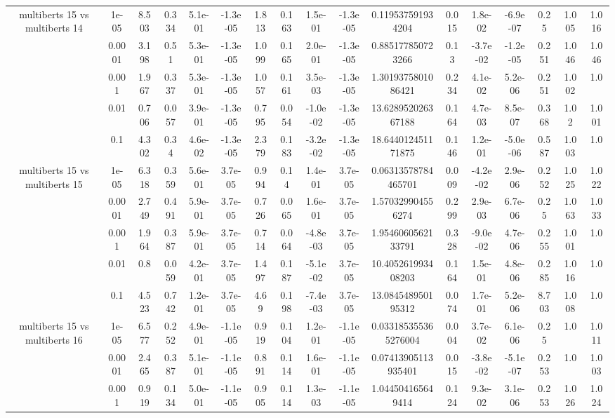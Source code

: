 \begin{tabular}{|c|c|c|c|c|c|c|c|c|c|c|c|c|c|c|c|c|}
\hline
\multirow{5}{*}{multiberts 15 vs multiberts 14} & 1e-05 & 8.503 & 0.334 & 5.1e-01 & -1.3e-05 & 1.813 & 0.163 & 1.5e-01 & -1.3e-05 & 0.119537591934204 & 0.015 & 1.8e-02 & -6.9e-07 & 0.25 & 1.005 & 1.016 \\
 & 0.0001 & 3.198 & 0.51 & 5.3e-01 & -1.3e-05 & 1.099 & 0.165 & 2.0e-01 & -1.3e-05 & 0.885177850723266 & 0.13 & -3.7e-02 & -1.2e-05 & 0.251 & 1.046 & 1.046 \\
 & 0.001 & 1.967 & 0.337 & 5.3e-01 & -1.3e-05 & 1.057 & 0.161 & 3.5e-03 & -1.3e-05 & 1.3019375801086421 & 0.234 & 4.1e-02 & 5.2e-06 & 0.251 & 1.002 & 1.0 \\
 & 0.01 & 0.706 & 0.057 & 3.9e-01 & -1.3e-05 & 0.795 & 0.054 & -1.0e-02 & -1.3e-05 & 13.628952026367188 & 0.164 & 4.7e-03 & 8.5e-07 & 0.368 & 1.02 & 1.001 \\
 & 0.1 & 4.302 & 0.34 & 4.6e-02 & -1.3e-05 & 2.379 & 0.183 & -3.2e-02 & -1.3e-05 & 18.644012451171875 & 0.146 & 1.2e-01 & -5.0e-06 & 0.587 & 1.003 & 1.0 \\
\hline
\multirow{5}{*}{multiberts 15 vs multiberts 15} & 1e-05 & 6.318 & 0.359 & 5.6e-01 & 3.7e-05 & 0.994 & 0.14 & 1.4e-01 & 3.7e-05 & 0.06313578784465701 & 0.009 & -4.2e-02 & 2.9e-06 & 0.252 & 1.025 & 1.022 \\
 & 0.0001 & 2.749 & 0.491 & 5.9e-01 & 3.7e-05 & 0.726 & 0.065 & 1.6e-01 & 3.7e-05 & 1.570329904556274 & 0.299 & 2.9e-03 & 6.7e-06 & 0.25 & 1.063 & 1.033 \\
 & 0.001 & 1.964 & 0.387 & 5.9e-01 & 3.7e-05 & 0.714 & 0.064 & -4.8e-03 & 3.7e-05 & 1.9546060562133791 & 0.328 & -9.0e-02 & 4.7e-06 & 0.255 & 1.001 & 1.0 \\
 & 0.01 & 0.8 & 0.059 & 4.2e-01 & 3.7e-05 & 1.497 & 0.187 & -5.1e-02 & 3.7e-05 & 10.405261993408203 & 0.164 & 1.5e-01 & 4.8e-06 & 0.285 & 1.016 & 1.0 \\
 & 0.1 & 4.523 & 0.742 & 1.2e-01 & 3.7e-05 & 4.69 & 0.198 & -7.4e-03 & 3.7e-05 & 13.084548950195312 & 0.074 & 1.7e-01 & 5.2e-06 & 8.703 & 1.008 & 1.0 \\
\hline
\multirow{5}{*}{multiberts 15 vs multiberts 16} & 1e-05 & 6.577 & 0.252 & 4.9e-01 & -1.1e-05 & 0.919 & 0.104 & 1.2e-01 & -1.1e-05 & 0.033185355365276004 & 0.004 & 3.7e-02 & 6.1e-06 & 0.25 & 1.0 & 1.011 \\
 & 0.0001 & 2.465 & 0.387 & 5.1e-01 & -1.1e-05 & 0.891 & 0.114 & 1.6e-01 & -1.1e-05 & 0.07413905113935401 & 0.015 & -3.8e-02 & -5.1e-07 & 0.253 & 1.0 & 1.003 \\
 & 0.001 & 0.919 & 0.134 & 5.0e-01 & -1.1e-05 & 0.905 & 0.114 & 1.3e-03 & -1.1e-05 & 1.044504165649414 & 0.124 & 9.3e-02 & 3.1e-06 & 0.253 & 1.026 & 1.024 \\

\end{tabular}
